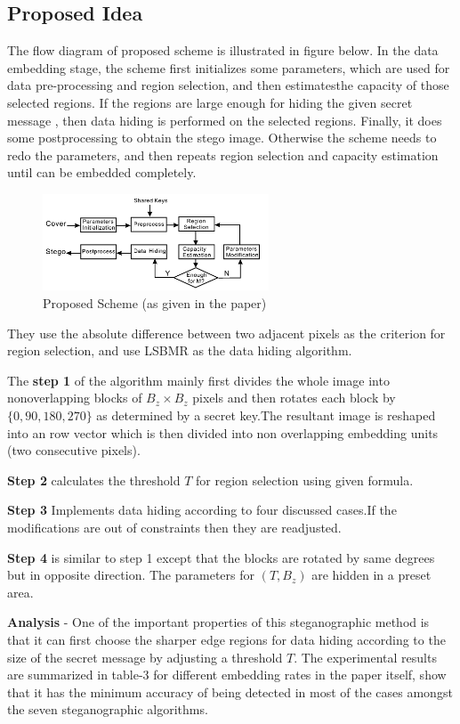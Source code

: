 \documentclass{report}
\begin{document}
\subsection{Proposed Idea}
The flow diagram of  proposed scheme is illustrated in figure below. In the data embedding stage, the scheme first initializes some parameters, which are used for  data pre-processing and region selection, and then estimatesthe capacity of those selected regions. If the regions are large enough for hiding the given secret message , then data hiding is performed on the selected regions. Finally, it does some postprocessing to obtain the stego image. Otherwise the scheme needs to redo the parameters, and then repeats region selection and capacity estimation until can be embedded completely.
\begin{figure}[H]
\centering
\includegraphics[width=0.6\textwidth]{images/proposed_scheme.png}
\caption{Proposed Scheme (as given in the paper)}
\end{figure}
They use the absolute difference between two adjacent pixels as the criterion for region selection, and use LSBMR as the data hiding algorithm.
\par The {\bf step 1} of the algorithm mainly first divides the whole image into nonoverlapping  blocks of $B_{z}\times B_{z}$ pixels and then rotates each block by $\{0,90,180,270\}$ as determined by a secret key.The resultant image is reshaped into an row vector which is then divided into non overlapping embedding units (two consecutive pixels).
\par {\bf Step 2} calculates the threshold $T$ for region selection using given formula.
\par {\bf Step 3}  Implements data hiding according to four discussed cases.If the modifications are out of constraints then they are readjusted.
\par {\bf Step 4} is similar to step 1 except that the blocks are rotated by same degrees but in opposite direction.
The parameters for $(T,B_{z})$ are hidden in a preset area.

\par {\bf Analysis} - One of the important properties of this steganographic method is that it can first choose the sharper edge regions for data hiding according to the size of the secret message by adjusting a threshold $T$.
The experimental results are  summarized in table-3 for different embedding rates in the paper itself, show that it has the minimum accuracy of being detected in most of the cases amongst the seven steganographic algorithms.
\end{document}

